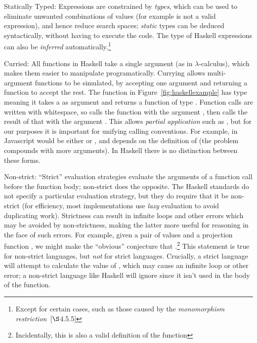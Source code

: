 \begin{description}
\item{Statically Typed}: Expressions are constrained by \emph{types}, which can
  be used to eliminate unwanted combinations of values (for example
   is not a valid expression), and hence reduce search spaces;
  \emph{static} types can be deduced syntactically, without having to execute
  the code. The type of Haskell expressions can also be \emph{inferred}
  automatically.\footnote{Except for certain cases, such as those caused by the
    \emph{monomorphism restriction}~\cite{marlow2010haskell}[$\S$4.5.5]}

\item{Curried}: All functions in Haskell take a single argument (as in
  $\lambda$-calculus), which makes them easier to manipulate programatically.
  Currying allows multi-argument functions to be simulated, by accepting one
  argument and returning a function to accept the rest. The  function
  in Figure~\ref{fig:haskellexample} has type  meaning it
  takes a  as argument and returns a function of type
  . Function calls are written with whitespace, so 
  calls the  function with the argument , then calls the result
  of that with the argument . This allows \emph{partial application} such
  as , but for our purposes it is important for
  unifying calling conventions. For example, in Javascript  would
  be either  or , and depends on the definition of
   (the problem compounds with more arguments). In Haskell there is no
  distinction between these forms.

\item{Non-strict}: ``Strict'' evaluation strategies evaluate the arguments of a
  function call before the function body; non-strict does the opposite. The
  Haskell standards do not specify a particular evaluation strategy, but they
  do require that it be non-strict (for efficiency, most implementations use
  \emph{lazy} evaluation to avoid duplicating work). Strictness can result in
  infinite loops and other errors which may be avoided by non-strictness,
  making the latter more useful for reasoning in the face of such errors.
  For example, given a pair of values  and a projection function
  , we might make the ``obvious''  conjecture that
  .\footnote{Incidentally, this is also a valid definition of
    the  function} This statement is true for non-strict languages, but
  \emph{not} for strict languages. Crucially, a strict language will attempt to
  calculate the value of , which may cause an infinite loop or other
  error; a non-strict language like Haskell will ignore  since it isn't
  used in the body of the  function.


\end{description}

